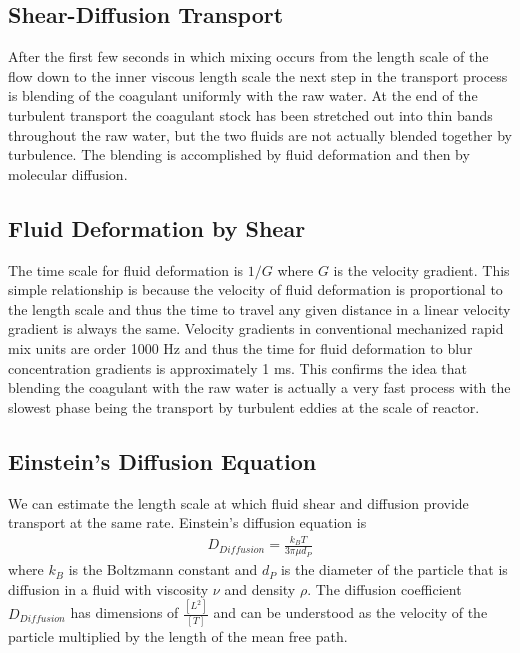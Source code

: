 \documentclass[letterpaper,10pt,english]{sphinxmanual}
\begin{document}
\subsection{Shear-Diffusion Transport}
\label{\detokenize{Rapid_Mix/RM_Derivations:shear-diffusion-transport}}\label{\detokenize{Rapid_Mix/RM_Derivations:heading-shear-diffusion-transport}}
After the first few seconds in which mixing occurs from the length scale of the flow down to the inner viscous length scale the next step in the transport process is blending of the coagulant uniformly with the raw water. At the end of the turbulent transport the coagulant stock has been stretched out into thin bands throughout the raw water, but the two fluids are not actually blended together by turbulence. The blending is accomplished by fluid deformation and then by molecular diffusion.


\subsection{Fluid Deformation by Shear}
\label{\detokenize{Rapid_Mix/RM_Derivations:fluid-deformation-by-shear}}\label{\detokenize{Rapid_Mix/RM_Derivations:heading-fluid-deformation-by-shear}}
The time scale for fluid deformation is \(1/G\) where \(G\) is the velocity gradient. This simple relationship is because the velocity of fluid deformation is proportional to the length scale and thus the time to travel any given distance in a linear velocity gradient is always the same. Velocity gradients in conventional mechanized rapid mix units are order 1000 Hz and thus the time for fluid deformation to blur concentration gradients is approximately 1 ms. This confirms the idea that blending the coagulant with the raw water is actually a very fast process with the slowest phase being the transport by turbulent eddies at the scale of reactor.


\subsection{Einstein’s Diffusion Equation}
\label{\detokenize{Rapid_Mix/RM_Derivations:einsteins-diffusion-equation}}\label{\detokenize{Rapid_Mix/RM_Derivations:heading-einstein-diffusion-equation}}
We can estimate the length scale at which fluid shear and diffusion provide transport at the same rate. Einstein’s diffusion equation is
\begin{equation}\label{equation:Rapid_Mix/RM_Derivations:Rapid_Mix/RM_Derivations:46}
\begin{split}D_{Diffusion} = \frac{k_B T}{3 \pi \mu d_P}\end{split}
\end{equation}
where \(k_B\) is the Boltzmann constant and \(d_P\) is the diameter of the particle that is diffusion in a fluid with viscosity \(\nu\) and density \(\rho\). The diffusion coefficient \(D_{Diffusion}\) has dimensions of \(\frac{[L^2]}{[T]}\) and can be understood as the velocity of the particle multiplied by the length of the mean free path.
\end{document}
